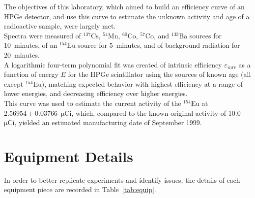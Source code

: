 \documentclass[12pt]{article}
\newcommand{\micCi}{$\mathrm{\mu Ci}$\xspace}
\newcommand{\CsSrc}{$\mathrm{^{137}Cs}$\xspace}
\newcommand{\MnSrc}{$\mathrm{^{54}Mn}$\xspace}
\newcommand{\CoSrcA}{$\mathrm{^{60}Co}$\xspace}
\newcommand{\CoSrcB}{$\mathrm{^{57}Co}$\xspace}
\newcommand{\BaSrc}{$\mathrm{^{133}Ba}$\xspace}
\newcommand{\EuSrc}{$\mathrm{^{154}Eu}$\xspace}
\begin{document}
The objectives of this laboratory, which aimed to build an efficiency curve of an HPGe detector, and use this curve to estimate the unknown activity and age of a radioactive sample, were largely met.\\

Spectra were measured of \CsSrc, \MnSrc, \CoSrcA, \CoSrcB, and \BaSrc sources for 10~minutes, of an \EuSrc source for 5~minutes, and of background radiation for 20~minutes.\\

A logarithmic four-term polynomial fit was created of intrinsic efficiency $\varepsilon_{intr}$ as a function of energy $E$ for the HPGe scintillator using the sources of known age (all except \EuSrc), matching expected behavior with highest efficiency at a range of lower energies, and decreasing efficiency over higher energies.\\

This curve was used to estimate the current activity of the \EuSrc at $2.56954 \pm 0.03766$~\micCi, which, compared to the known original activity of 10.0~\micCi, yielded an estimated manufacturing date of September 1999.

% 
\pagebreak\printbibliography

\appendix
\pagebreak
\FloatBarrier\section{Equipment Details}\label{app:equip}
In order to better replicate experiments and identify issues, the details of each equipment piece are recorded in Table~\ref{tab:equip}.
\end{document}
